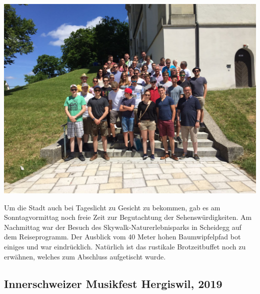 \begin{history}
    \begin{MulticolFigure}
        \centering
        \includegraphics[width=0.93\linewidth]{./chap/2001-2024/2017/Reisegruppe.jpg}
    \end{MulticolFigure}

    Um die Stadt auch bei Tageslicht zu Gesicht zu bekommen, gab es am
    Sonntagvormittag noch freie Zeit zur Begutachtung der Sehenswürdigkeiten. Am
    Nachmittag war der Besuch des Skywalk-Naturerlebnisparks in Scheidegg auf
    dem Reiseprogramm. Der Ausblick vom 40 Meter hohen Baumwipfelpfad bot
    einiges und war eindrücklich. Natürlich ist das rustikale Brotzeitbuffet
    noch zu erwähnen, welches zum Abschluss aufgetischt wurde.

\end{history}

\subsection*{Innerschweizer Musikfest Hergiswil, 2019}

